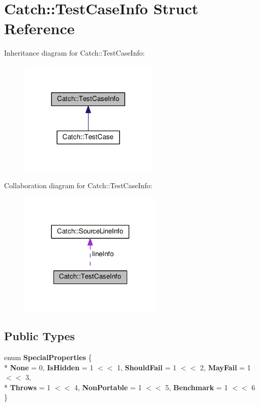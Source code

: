 \hypertarget{structCatch_1_1TestCaseInfo}{}\section{Catch\+:\+:Test\+Case\+Info Struct Reference}
\label{structCatch_1_1TestCaseInfo}


Inheritance diagram for Catch\+:\+:Test\+Case\+Info\+:\nopagebreak
\begin{figure}[H]
\begin{center}
\leavevmode
\includegraphics[width=188pt]{structCatch_1_1TestCaseInfo__inherit__graph}
\end{center}
\end{figure}


Collaboration diagram for Catch\+:\+:Test\+Case\+Info\+:\nopagebreak
\begin{figure}[H]
\begin{center}
\leavevmode
\includegraphics[width=194pt]{structCatch_1_1TestCaseInfo__coll__graph}
\end{center}
\end{figure}
\subsection*{Public Types}
\begin{DoxyCompactItemize}
\item 
enum {\bfseries Special\+Properties} \{ \\*
{\bfseries None} = 0, 
{\bfseries Is\+Hidden} = 1 $<$$<$ 1, 
{\bfseries Should\+Fail} = 1 $<$$<$ 2, 
{\bfseries May\+Fail} = 1 $<$$<$ 3, 
\\*
{\bfseries Throws} = 1 $<$$<$ 4, 
{\bfseries Non\+Portable} = 1 $<$$<$ 5, 
{\bfseries Benchmark} = 1 $<$$<$ 6
 \}\hypertarget{structCatch_1_1TestCaseInfo_a39b232f74b4a7a6f2183b96759027eac}{}\label{structCatch_1_1TestCaseInfo_a39b232f74b4a7a6f2183b96759027eac}

\end{DoxyCompactItemize}
